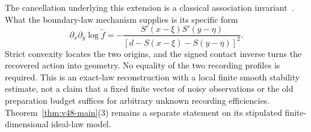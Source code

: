 The cancellation underlying this extension is a classical association
invariant~\cite{HollandWang1987,Osius2009}.  What the boundary-law mechanism
supplies is its specific form
\[
 \partial_x\partial_y\log\widetilde f
 =-\frac{S'(x-\xi)S'(y-\eta)}
           {[d-S(x-\xi)-S(y-\eta)]^2}.
\]
Strict convexity locates the two origins, and the signed contact inverse
turns the recovered action into geometry.  No equality of the two recording
profiles is required.  This is an exact-law reconstruction with a local
finite smooth stability estimate, not a claim that a fixed finite vector
of noisy observations or the old preparation budget suffices for arbitrary
unknown recording efficiencies.  Theorem~\ref{thm:v48-main}(3) remains a
separate statement on its stipulated finite-dimensional ideal-law model.

